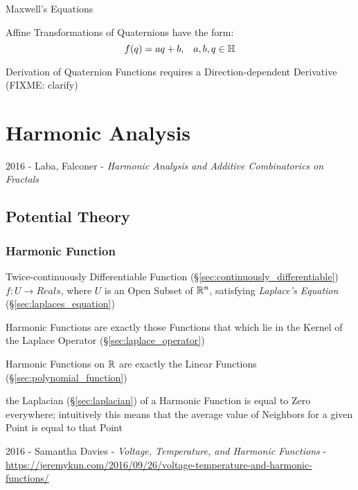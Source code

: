 Maxwell's Equations

Affine Transformations of Quaternions have the form:
\[
  f(q) = aq + b, \;\;\; a,b,q \in \mathbb{H}
\]

Derivation of Quaternion Functions requires a Direction-dependent Derivative
(FIXME: clarify)



\section{Harmonic Analysis}\label{sec:harmonic_analysis}

2016 - Laba, Falconer - \emph{Harmonic Analysis and Additive Combinatorics on
  Fractals}



\subsection{Potential Theory}\label{sec:potential_theory}

\subsubsection{Harmonic Function}\label{sec:harmonic_function}

Twice-continuously Differentiable Function
(\S\ref{sec:continuously_differentiable}) $f : U \rightarrow Reals$,
where $U$ is an Open Subset of $\mathbb{R}^n$, satisfying \emph{Laplace's
  Equation} (\S\ref{sec:laplaces_equation})

Harmonic Functions are exactly those Functions that which lie in the Kernel of
the Laplace Operator (\S\ref{sec:laplace_operator})

Harmonic Functions on $\mathbb{R}$ are exactly the Linear Functions
(\S\ref{sec:polynomial_function})

the Laplacian (\S\ref{sec:laplacian}) of a Harmonic Function is equal to Zero
everywhere; intuitively this means that the average value of Neighbors for a
given Point is equal to that Point

2016 - Samantha Davies - \emph{Voltage, Temperature, and Harmonic
  Functions} -
\url{https://jeremykun.com/2016/09/26/voltage-temperature-and-harmonic-functions/}

